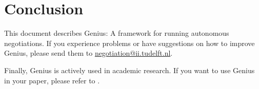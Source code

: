 \documentclass[]{llncs}
\newcommand\Genius{{\sc Genius}}
\begin{document}
\FloatBarrier



\newpage



\section{Conclusion}

This document describes {\Genius}: A framework for running autonomous negotiations. If you experience problems or have suggestions on how to improve {\Genius}, please send them to \url{negotiation@ii.tudelft.nl}. 

Finally, {\Genius} is actively used in academic research. If you want to use {\Genius} in your paper, please refer to \cite{Genius}.






\end{document}
